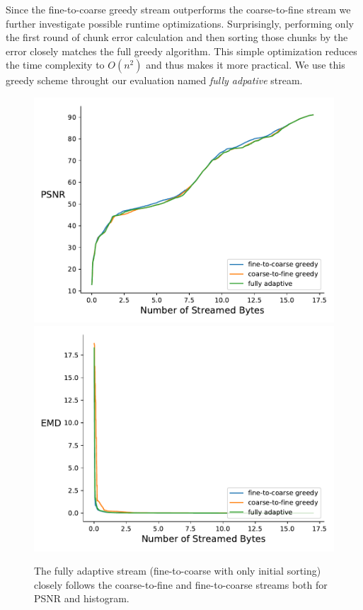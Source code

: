 Since the fine-to-coarse greedy stream outperforms the coarse-to-fine stream we further investigate possible
runtime optimizations. Surprisingly, performing only the first round of chunk error calculation and then sorting
those chunks by the error closely matches the full greedy algorithm. This simple optimization reduces the time
complexity to $O(n^2)$ and thus makes it more practical. We use this greedy scheme throught our evaluation named
\emph{fully adpative} stream.

\begin{figure}
        \centering
        \includegraphics[width=0.48\linewidth]{img/figure6/rmse-miranda-viscosity}
        \includegraphics[width=0.48\linewidth]{img/figure6/histogram-miranda-viscosity}
        \caption{The fully adaptive stream (fine-to-coarse with only initial sorting) closely follows the coarse-to-fine and
                 fine-to-coarse streams both for PSNR and histogram.}
\end{figure}

